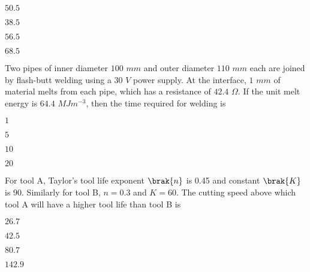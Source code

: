 \hfill{}
\begin{enumerate}
\begin{multicols}{4}
\item $50.5$
\item $38.5$
\item $56.5$
\item $68.5$
\end{multicols}
\end{enumerate}

\item Two pipes of inner diameter $100$ $mm$ and outer diameter $110$ $mm$ each are joined by flash-butt welding using a $30$ $V$ power supply. At the interface, $1$ $mm$ of material melts from each pipe, which has a resistance of $42.4$ $\Omega$. If the unit melt energy is $64.4$ $MJm^{-3}$, then the time required for welding  is

\hfill{}
\begin{enumerate}
\begin{multicols}{4}
\item $1$
\item $5$
\item $10$
\item $20$
\end{multicols}
\end{enumerate}

\item For tool A, Taylor's tool life exponent $\brak{n}$ is 0.45 and constant $\brak{K}$ is 90. Similarly for tool B, $n=0.3$ and $K=60$. The cutting speed  above which tool A will have a higher tool life than tool B is

\hfill{}
\begin{enumerate}
\begin{multicols}{2}
\item $26.7$
\item $42.5$
\item $80.7$
\item $142.9$
\end{multicols}
\end{enumerate}

